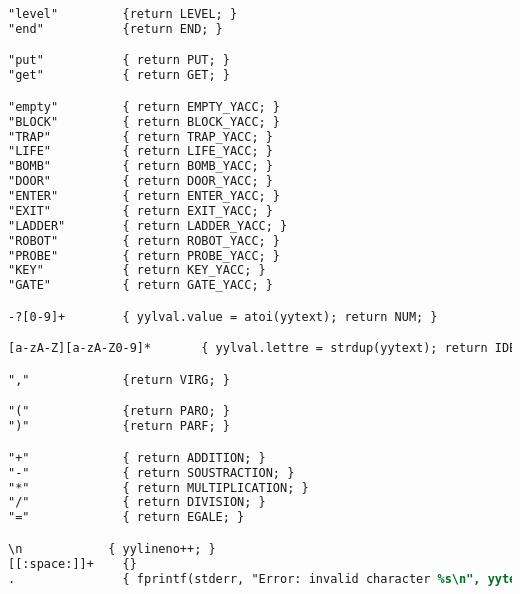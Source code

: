 \lstset{style=mystyle}
\begin{lstlisting}[language=lex, caption=Notre analyseur syntaxe]
"level"         {return LEVEL; }
"end"           {return END; }

"put"           { return PUT; }
"get"           { return GET; }

"empty"         { return EMPTY_YACC; }
"BLOCK"         { return BLOCK_YACC; }
"TRAP"          { return TRAP_YACC; }
"LIFE"          { return LIFE_YACC; }
"BOMB"          { return BOMB_YACC; }
"DOOR"          { return DOOR_YACC; }
"ENTER"         { return ENTER_YACC; }
"EXIT"          { return EXIT_YACC; }
"LADDER"        { return LADDER_YACC; }
"ROBOT"         { return ROBOT_YACC; }
"PROBE"         { return PROBE_YACC; }
"KEY"           { return KEY_YACC; }
"GATE"          { return GATE_YACC; }

-?[0-9]+        { yylval.value = atoi(yytext); return NUM; }

[a-zA-Z][a-zA-Z0-9]*       { yylval.lettre = strdup(yytext); return IDENTIFIER; }

","             {return VIRG; }

"("             {return PARO; }
")"             {return PARF; }

"+"             { return ADDITION; }
"-"             { return SOUSTRACTION; }
"*"             { return MULTIPLICATION; }
"/"             { return DIVISION; }
"="             { return EGALE; }

\n            { yylineno++; }
[[:space:]]+    {}
.               { fprintf(stderr, "Error: invalid character %s\n", yytext); }

\end{lstlisting}


\newpage